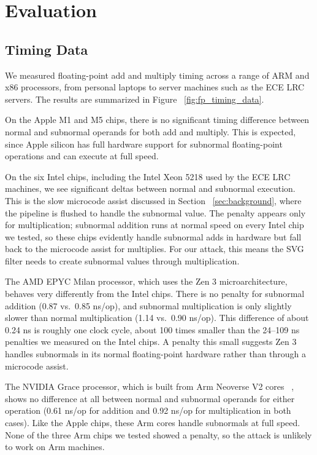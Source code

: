 \section{Evaluation}
\label{sec:evaluation}

\subsection{Timing Data}
\label{subsec:timing_data}
We measured floating-point add and multiply timing across a range of ARM and x86 processors, from personal laptops to server machines such as the ECE LRC servers. The results are summarized in Figure ~\ref{fig:fp_timing_data}.

On the Apple M1 and M5 chips, there is no significant timing difference between normal and subnormal operands for both add and multiply. This is expected, since Apple silicon has full hardware support for subnormal floating-point operations and can execute at full speed.

On the six Intel chips, including the Intel Xeon 5218 used by the ECE LRC machines, we see significant deltas between normal and subnormal execution. This is the slow microcode assist discussed in Section ~\ref{sec:background}, where the pipeline is flushed to handle the subnormal value. The penalty appears only for multiplication; subnormal addition runs at normal speed on every Intel chip we tested, so these chips evidently handle subnormal adds in hardware but fall back to the microcode assist for multiplies. For our attack, this means the SVG filter needs to create subnormal values through multiplication.

The AMD EPYC Milan processor, which uses the Zen 3 microarchitecture, behaves very differently from the Intel chips. There is no penalty for subnormal addition (0.87 vs.\ 0.85 ns/op), and subnormal multiplication is only slightly slower than normal multiplication (1.14 vs.\ 0.90 ns/op). This difference of about 0.24 ns is roughly one clock cycle, about 100 times smaller than the 24--109 ns penalties we measured on the Intel chips. A penalty this small suggests Zen 3 handles subnormals in its normal floating-point hardware rather than through a microcode assist. 

The NVIDIA Grace processor, which is built from Arm Neoverse V2 cores ~\cite{nvidia2023grace}, shows no difference at all between normal and subnormal operands for either operation (0.61 ns/op for addition and 0.92 ns/op for multiplication in both cases). Like the Apple chips, these Arm cores handle subnormals at full speed. None of the three Arm chips we tested showed a penalty, so the attack is unlikely to work on Arm machines.

